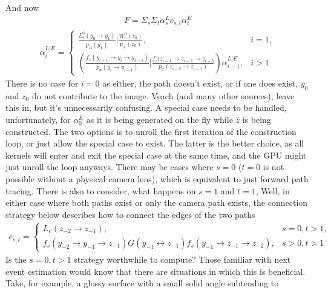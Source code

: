 \documentclass{article}
\begin{document}
    And now
  \begin{align}
    F = \Sigma_s\Sigma_t \alpha^L_s c_{s, t} \alpha^E_t
  \end{align}
  \begin{align}
    \alpha^{L|E}_i =
    \begin{cases}
      \frac{L_e^0(y_0 \rightarrow y_1)}{p_A(y_1)} | \frac{W^0_e(z_0)}{p_A(z_0)},
      &i = 1,\\
      (\frac{f_s(y_{i+1} \rightarrow y_i \rightarrow y_{i-1})}{p_{\sigma}(y_i
      \rightarrow y_{i-1})} | \frac{f_s(z_{i-1} \rightarrow z_{i-2} \rightarrow
      z_{i-3}}{p_\sigma(z_{i-2} \rightarrow z_{i-1})}) \alpha^{L|E}_{i-1},
      &i > 1
    \end{cases}
  \end{align}
    There is no case for $i = 0$ as either, the path doesn't exist, or if one
    does exist, $y_0$ and $z_0$ do not contribute to the image. Veach (and many other
    sources), leave this in, but it's unnecessarily confusing. A special case
    needs to be handled, unfortunately, for $\alpha^E_0$ as it is being
    generated on the fly while $\bar{z}$ is being constructed. The two options
    is to unroll the first iteration of the construction loop, or just allow the
    special case to exist. The latter is the better choice, as all kernels will
    enter and exit the special case at the same time, and the GPU might just
    unroll the loop anyways.
    There may be cases where $s = 0$ ($t = 0$ is not possible without a
    physical camera lens), which is equivalent to just forward path tracing.
    There is also to consider, what happens on $s = 1$ and $t = 1$, %
    Well, in either case where both paths exist or only the camera path exists,
    the connection strategy below describes how to connect the edges of the two
    paths
  \begin{align}
    c_{s, t} =
    \begin{cases}
      L_e(z_{-2} \rightarrow z_{-1}), &s = 0, t > 1,\\
      f_s(y_{-2} \rightarrow y_{-1} \rightarrow z_{-1}) G(y_{-1} \leftrightarrow
      z_{-1}) f_s(y_{-1} \rightarrow z_{-1} \rightarrow z_{-2}), &s > 0, t > 1
    \end{cases}
  \end{align}
    Is the $s = 0, t > 1$
    strategy worthwhile to compute? Those familiar with next event
    estimation would know that there are situations in which this is beneficial.
    Take, for example, a glossy surface with a small solid angle subtending to
\end{document}

